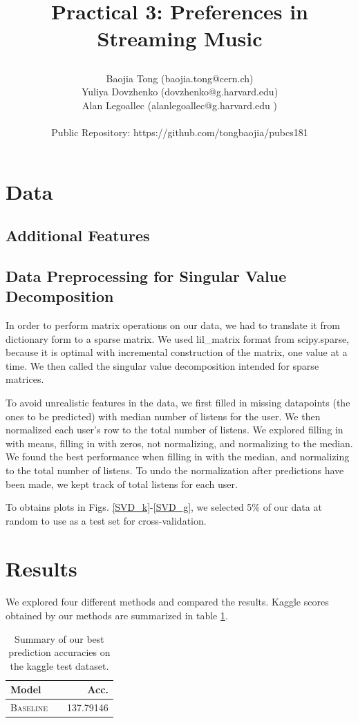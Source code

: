 \documentclass[11pt]{article}
\title{\begin{center}
{\Large Practical 3: Preferences in Streaming Music}
\end{center}}
\author{ Baojia Tong (baojia.tong@cern.ch)\\Yuliya Dovzhenko (dovzhenko@g.harvard.edu)\\Alan Legoallec (alanlegoallec@g.harvard.edu )\\\\Public Repository: https://github.com/tongbaojia/pubcs181}
\begin{document}
\maketitle{}
\section{Data}
\subsection{Additional Features}

\subsection{Data Preprocessing for Singular Value Decomposition}
In order to perform matrix operations on our data, we had to translate it from dictionary form to a sparse matrix. We used lil\_matrix format from scipy.sparse, because it is optimal with incremental construction of the matrix, one value at a time. We then called the singular value decomposition intended for sparse matrices.

 To avoid unrealistic features in the data, we first  filled in missing datapoints (the ones to be predicted) with median number of listens for the user. We then normalized each user's row to the total number of listens. We explored filling in with means, filling in with zeros, not normalizing, and normalizing to the median. We found the best performance when filling in with the median, and normalizing to the total number of listens. To undo the normalization after predictions have been made, we kept track of total listens for each user. 
 
To obtains plots in Figs. \ref{SVD_k}-\ref{SVD_g}, we selected 5\% of our data at random to use as a test set for cross-validation. 
\paragraph{} 
\section{Results}
\paragraph{} We explored four different methods and compared the results. Kaggle scores obtained by our methods are summarized in table \ref{tab:results}. 
  \begin{table}
\centering
\begin{tabular}{llr}
 \toprule
 Model &  & Acc. \\
 \midrule
 \textsc{Baseline} & &137.79146\\
 \bottomrule
\end{tabular}
\caption{\label{tab:results} Summary of our best prediction accuracies on the kaggle test dataset.}
\end{table}
\end{document}
